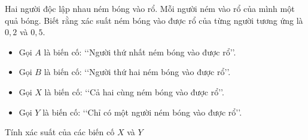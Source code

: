 \begin{bt}%

	Hai người độc lập nhau ném bóng vào rổ. Mỗi người ném vào rổ của mình một quả bóng. Biết rằng xác suất ném bóng vào được rổ của từng người tương ứng là $0{,}2$ và $0{,}5$.
	\begin{itemize}
		\item Gọi $A$ là biến cố: \lq\lq Người thứ nhất ném bóng vào được rổ\rq\rq.
		\item Gọi $B$ là biến cố: \lq\lq Người thứ hai ném bóng vào được rổ\rq\rq.
		\item Gọi $X$ là biến cố: \lq\lq Cả hai cùng ném bóng vào được rổ\rq\rq.
		\item Gọi $Y$ là biến cố: \lq\lq Chỉ có một người ném bóng vào được rổ\rq\rq.
	\end{itemize}
	Tính xác suất của các biến cố $X$ và $Y$ 
\end{bt}


